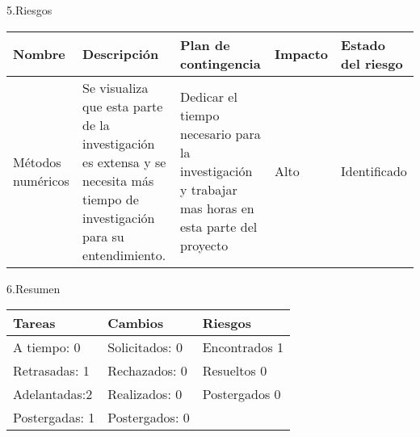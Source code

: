 \documentclass[12pt]{report}
\numberwithin{equation}{section}
\begin{document}
\begin{flushleft}
\large{5.Riesgos}\\


\begin{table}[H]
\begin{tabular}{|m{2cm}|m{4cm}|m{4cm}|m{2cm}|m{2cm}|}
\hline 
\textbf{Nombre } & \textbf{Descripci\'on} & \textbf{Plan de contingencia} & \textbf{Impacto} & \textbf{Estado del riesgo}  \\
\hline
\hline
\small{Métodos numéricos} &\small{Se visualiza que esta parte de la investigaci\'on es extensa y se necesita m\'as tiempo de investigaci\'on para su entendimiento. } & \small{Dedicar el tiempo necesario para la investigaci\'on y trabajar mas horas en esta parte del proyecto} & Alto   &Identificado \\
\hline
\end{tabular}
\label{tabla: TABLA CE de nuevos riesgos Seg}
\end{table}

\large{6.Resumen}\\

\begin{table}[H]
\begin{tabular}{|m{5cm}|m{5cm}|m{5cm}|}
\hline
\textbf{Tareas} & \textbf{Cambios} & \textbf{Riesgos}\\
\hline \hline 
A tiempo: 0 & Solicitados: 0 & Encontrados 1 \\
\hline
Retrasadas: 1 & Rechazados: 0 & Resueltos 0 \\
\hline
Adelantadas:2  & Realizados: 0  & Postergados 0 \\
\hline
Postergadas: 1 & Postergados:  0 & \\
\hline
\end{tabular}
\label{tabla: TABLA CE Resumen}
\end{table}

\end{flushleft}
\end{document}
